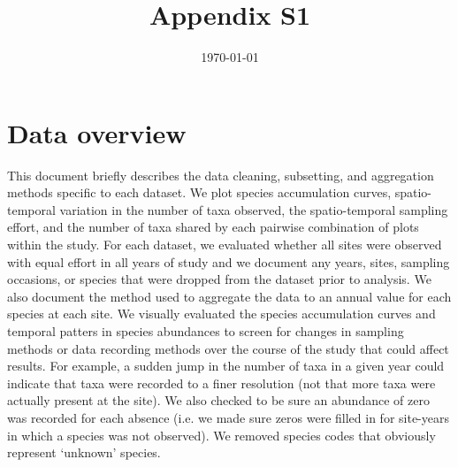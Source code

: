 \documentclass[11pt, oneside]{article}
\title{Appendix S1}
\author[1]{}
\author[2]{}
\author[3]{}
\date{\today}
\begin{document}
\maketitle

\doublespacing

\section {Data overview}
This document briefly describes the data cleaning, subsetting, and aggregation methods specific to each dataset.
We plot species accumulation curves, spatio-temporal variation in the number of taxa observed, the spatio-temporal sampling effort, and the number of taxa shared by each pairwise combination of plots within the study.
For each dataset, we evaluated whether all sites were observed with equal effort in all years of study and we document any years, sites, sampling occasions, or species that were dropped from the dataset prior to analysis. 
We also document the method used to aggregate the data to an annual value for each species at each site.
We visually evaluated the species accumulation curves and temporal patters in species abundances to screen for changes in sampling methods or data recording methods over the course of the study that could affect results.
For example, a sudden jump in the number of taxa in a given year could indicate that taxa were recorded to a finer resolution (not that more taxa were actually present at the site).  
We also checked to be sure an abundance of zero was recorded for each absence (i.e. we made sure zeros were filled in for site-years in which a species was not observed).
We removed species codes that obviously represent `unknown' species.
\end{document}
